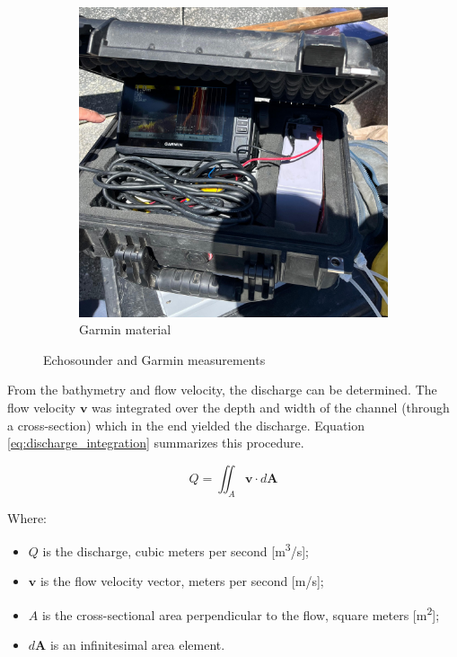 \begin{figure}[H]
\begin{subfigure}[b]{0.48\textwidth}
    \end{subfigure}
    \hfill
    \begin{subfigure}[b]{0.48\textwidth}
        \includegraphics[width=\linewidth]{figures/ch4/garmin.jpg}
        \caption{Garmin material}
        
    \end{subfigure}
    \caption{Echosounder and Garmin measurements}
    \label{fig:Garmin}
\end{figure}

From the bathymetry and flow velocity, the discharge can be determined. The flow velocity \(\mathbf{v}\) was integrated over the depth and width of the channel (through a cross-section) which in the end yielded the discharge. Equation \ref{eq:discharge_integration} summarizes this procedure.

\begin{equation}
    Q = \iint_A \mathbf{v} \cdot d\mathbf{A}
    \label{eq:discharge_integration}
\end{equation}

\noindent Where:
\begin{itemize}
    \item \(Q\) is the discharge, cubic meters per second [m\textsuperscript{3}/s];
    \item \(\mathbf{v}\) is the flow velocity vector, meters per second [m/s];
    \item \(A\) is the cross-sectional area perpendicular to the flow, square meters [m\textsuperscript{2}];
    \item \(d\mathbf{A}\) is an infinitesimal area element.
\end{itemize}

